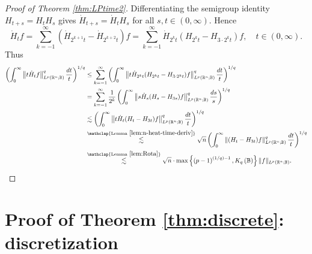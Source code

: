 \documentclass[11pt,reqno]{amsart}
\newcommand{\1}{\mathbf 1}
\newcommand{\R}{\mathbb{R}}
\begin{document}
\begin{proof}[Proof of Theorem \ref{thm:LPtime2}] Differentiating the semigroup identity $H_{t+s}=H_tH_s$  gives $\dot{H}_{t+s}=\dot{H}_tH_s$ for all $s,t\in (0,\infty)$. Hence
	\begin{equation*}
	\dot H_t f=\sum_{k=-1}^\infty \left(\dot H_{2^{k+1} t}-\dot H_{2^{k+2}t}\right)f
		=\sum_{k=-1}^\infty \dot H_{2^k t}\left(H_{2^k t}-H_{3\cdot 2^{k}t}\right)f,\quad t\in (0,\infty).
	\end{equation*}
Thus
	\begin{align*}
		\left(\int_0^\infty\left\|t\dot H_t f\right\|_{L^p(\R^n;\mathbb{B})}^q\frac{d t}{t}\right)^{1/q}
		&\le \sum_{k=-1}^\infty \left(\int_0^\infty\left\|t\dot H_{2^k t}(H_{2^k t}-H_{3\cdot 2^{k}t}) f \right\|_{L^p(\R^n;\mathbb{B})}^q\frac{d t}{t}\right)^{1/q} \\
		&=\sum_{k=-1}^\infty \frac{1}{2^{k}}\left(\int_0^\infty\left\|s \dot H_{s}(H_{s}-H_{3s}) f\right\|_{L^p(\R^n;\mathbb{B})}^q\frac{d s}{s}\right)^{1/q}\\
		&\lesssim \left(\int_0^\infty\left\|t \dot H_{t}(H_{t}-H_{3t}) f\right\|_{L^p(\R^n;\mathbb{B})}^q\frac{d t}{t}\right)^{1/q}\\
		&\stackrel{\mathclap{\mathrm{Lemma~}\ref{lem:n-heat-time-deriv}}}{\lesssim} \sqrt{n}\left(\int_0^\infty\left\|(H_{t}-H_{3t}) f\right\|_{L^p(\R^n;\mathbb{B})}^q\frac{d t}{t}\right)^{1/q}\\
		&\stackrel{\mathclap{\mathrm{Lemma~}\ref{lem:Rota}}}{\lesssim} \sqrt{n}\cdot \max\left\{\left(p-1\right)^{(1/q)-1},K_q\left(\mathbb{B}\right)\right\}\|f\|_{L^p(\R^n;\mathbb{B})}. \qedhere
	\end{align*}
\end{proof}























\section{Proof of Theorem \ref{thm:discrete}: discretization}\label{sec:proof main}
\end{document}
